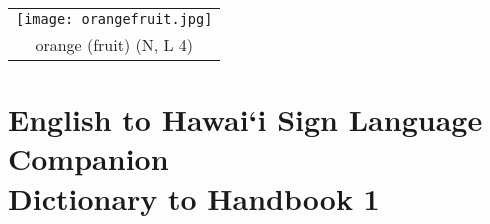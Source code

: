 \documentclass{tufte-book}
\newcommand{\sansnormal}{\sffamily\selectfont}
\begin{document}
\begin{fullwidth}
\begin{table*}[h!]
\begin{tabular}{c}
 \texttt{[image: orangefruit.jpg]}\\
 orange (fruit) (N, L 4)\\
  \end{tabular}
\end{table*} 



\label{page:endtwohand}%
\end{fullwidth}
\chapter[English to Hawai`i Sign Language Mini-Dictionary]{English to Hawai`i Sign Language Companion\\ Dictionary to Handbook 1}
\end{document}
